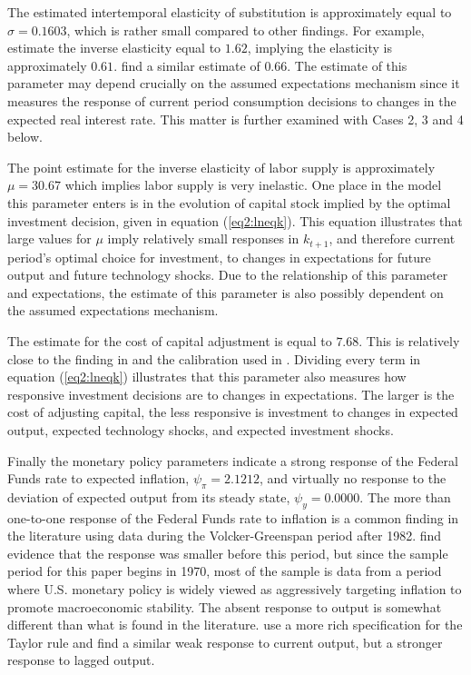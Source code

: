The estimated intertemporal elasticity of substitution is approximately equal to $\sigma=0.1603$, which is rather small compared to other findings.  For example,  estimate the inverse elasticity equal to $1.62$, implying the elasticity is approximately $0.61$.   find a similar estimate of $0.66$.  The estimate of this parameter may depend crucially on the assumed expectations mechanism since it measures the response of current period consumption decisions to changes in the expected real interest rate.  This matter is further examined with Cases 2, 3 and 4 below.

The point estimate for the inverse elasticity of labor supply is approximately $\mu=30.67$ which implies labor supply is very inelastic.  One place in the model this parameter enters is in the evolution of capital stock implied by the optimal investment decision, given in equation (\ref{eq2:lneqk}).  This equation illustrates that large values for $\mu$ imply relatively small responses in $k_{t+1}$, and therefore current period's optimal choice for investment, to changes in expectations for future output and future technology shocks.  Due to the relationship of this parameter and expectations, the estimate of this parameter is also possibly dependent on the assumed expectations mechanism.

The estimate for the cost of capital adjustment is equal to $7.68$.  This is relatively close to the finding in  and the calibration used in .  Dividing every term in equation (\ref{eq2:lneqk}) illustrates that this parameter also measures how responsive investment decisions are to changes in expectations.  The larger is the cost of adjusting capital, the less responsive is investment to changes in expected output, expected technology shocks, and expected investment shocks. 

Finally the monetary policy parameters indicate a strong response of the Federal Funds rate to expected inflation, $\psi_{\pi}=2.1212$, and virtually no response to the deviation of expected output from its steady state, $\psi_{y}=0.0000$.  The more than one-to-one response of the Federal Funds rate to inflation is a common finding in the literature using data during the Volcker-Greenspan period after 1982.   find evidence that the response was smaller before this period, but since the sample period for this paper begins in 1970, most of the sample is data from a period where U.S. monetary policy is widely viewed as aggressively targeting inflation to promote macroeconomic stability.  The absent response to output is somewhat different than what is found in the literature.   use a more rich specification for the Taylor rule and find a similar weak response to current output, but a stronger response to lagged output.  \\

